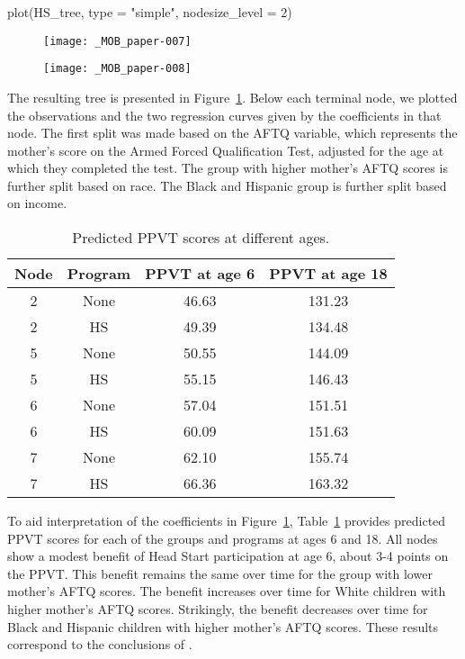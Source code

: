 \documentclass[doc,floatsintext,natbib]{apa7}
\begin{document}
\begin{Schunk}
\begin{Sinput}
 plot(HS_tree, type = "simple", nodesize_level = 2)
\end{Sinput}
\end{Schunk}

\begin{figure}%
\caption{}
\texttt{[image: \_MOB\_paper-007]}

\vspace*{-3cm}

\texttt{[image: \_MOB\_paper-008]}
\label{fig:lmm_tree}
\end{figure}%

The resulting tree is presented in Figure~\ref{fig:lmm_tree}. Below each terminal node, we plotted the observations and the two regression curves given by the coefficients in that node. The first split was made based on the AFTQ variable, which represents the mother's score on the Armed Forced Qualification Test, adjusted for the age at which they completed the test. The group with higher mother's AFTQ scores is further split based on race. The Black and Hispanic group is further split based on income. 

\begin{table}

\caption{\label{tab:predictions}Predicted PPVT scores at different ages.}
\begin{tabular}[t]{cccc}
\toprule
Node & Program & PPVT at age 6 & PPVT at age 18\\
\midrule
2 & None & 46.63 & 131.23\\
2 & HS & 49.39 & 134.48\\
5 & None & 50.55 & 144.09\\
5 & HS & 55.15 & 146.43\\
6 & None & 57.04 & 151.51\\
6 & HS & 60.09 & 151.63\\
7 & None & 62.10 & 155.74\\
7 & HS & 66.36 & 163.32\\
\bottomrule
\end{tabular}
\end{table}
To aid interpretation of the coefficients in Figure~\ref{fig:lmm_tree}, Table~\ref{tab:predictions} provides predicted PPVT scores for each of the groups and programs at ages 6  and 18. All nodes show a modest benefit of Head Start participation at age 6, about 3-4 points on the PPVT. This benefit remains the same over time for the group with lower mother's AFTQ scores. The benefit increases over time for White children with higher mother's AFTQ scores. Strikingly, the benefit decreases over time for Black and Hispanic children with higher mother's AFTQ scores. These results correspond to the conclusions of \cite{Demi09}. 
\end{document}
